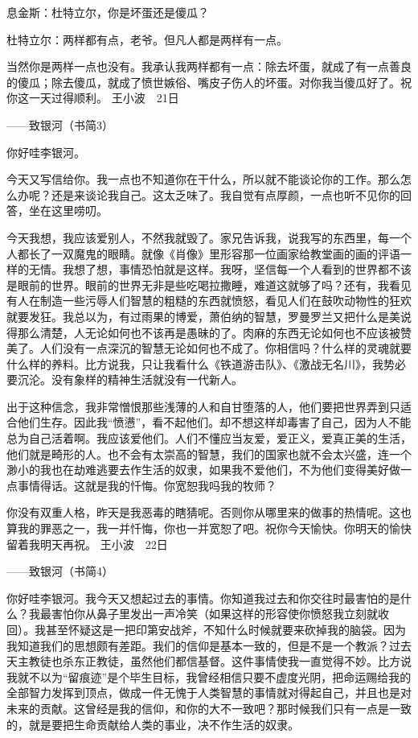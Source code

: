 息金斯：杜特立尔，你是坏蛋还是傻瓜？　 

杜特立尔：两样都有点，老爷。但凡人都是两样有一点。 

当然你是两样一点也没有。我承认我两样都有一点：除去坏蛋，就成了有一点善良的傻瓜；除去傻瓜，就成了愤世嫉俗、嘴皮子伤人的坏蛋。对你我当傻瓜好了。祝你这一天过得顺利。 王小波　21日 







——致银河（书简3） 

你好哇李银河。 

今天又写信给你。我一点也不知道你在干什么，所以就不能谈论你的工作。那么怎么办呢？还是来谈论我自己。这太乏味了。我自觉有点厚颜，一点也听不见你的回答，坐在这里唠叨。 

今天我想，我应该爱别人，不然我就毁了。家兄告诉我，说我写的东西里，每一个人都长了一双魔鬼的眼睛。就像《肖像》里形容那一位画家给教堂画的画的评语一样的无情。我想了想，事情恐怕就是这样。我呀，坚信每一个人看到的世界都不该是眼前的世界。眼前的世界无非是些吃喝拉撒睡，难道这就够了吗？还有，我看见有人在制造一些污辱人们智慧的粗糙的东西就愤怒，看见人们在鼓吹动物性的狂欢就要发狂。我总以为，有过雨果的博爱，萧伯纳的智慧，罗曼罗兰又把什么是美说得那么清楚，人无论如何也不该再是愚昧的了。肉麻的东西无论如何也不应该被赞美了。人们没有一点深沉的智慧无论如何也不成了。你相信吗？什么样的灵魂就要什么样的养料。比方说我，只让我看什么《铁道游击队》、《激战无名川》，我势必要沉沦。没有象样的精神生活就没有一代新人。 

出于这种信念，我非常憎恨那些浅薄的人和自甘堕落的人，他们要把世界弄到只适合他们生存。因此我“愤懑”，看不起他们。却不想这样却毒害了自己，因为人不能总为自己活着啊。我应该爱他们。人们不懂应当友爱，爱正义，爱真正美的生活，他们就是畸形的人。也不会有太崇高的智慧，我们的国家也就不会太兴盛，连一个渺小的我也在劫难逃要去作生活的奴隶，如果我不爱他们，不为他们变得美好做一点事情得话。这就是我的忏悔。你宽恕我吗我的牧师？ 

你没有双重人格，昨天是我恶毒的瞎猜呢。否则你从哪里来的做事的热情呢。这也算我的罪恶之一，我一并忏悔，你也一并宽恕了吧。祝你今天愉快。你明天的愉快留着我明天再祝。 王小波　22日 







——致银河（书简4） 

你好哇李银河。我今天又想起过去的事情。你知道我过去和你交往时最害怕的是什么？我最害怕你从鼻子里发出一声冷笑（如果这样的形容使你愤怒我立刻就收回）。我甚至怀疑这是一把印第安战斧，不知什么时候就要来砍掉我的脑袋。因为我知道我们的思想颇有差距。我们的信仰是基本一致的，但是不是一个教派？过去天主教徒也杀东正教徒，虽然他们都信基督。这件事情使我一直觉得不妙。比方说我就不以为“留痕迹”是个毕生目标，我曾经相信只要不虚度光阴，把命运赐给我的全部智力发挥到顶点，做成一件无愧于人类智慧的事情就对得起自己，并且也是对未来的贡献。这曾经是我的信仰，和你的大不一致吧？那时候我们只有一点是一致的，就是要把生命贡献给人类的事业，决不作生活的奴隶。 

